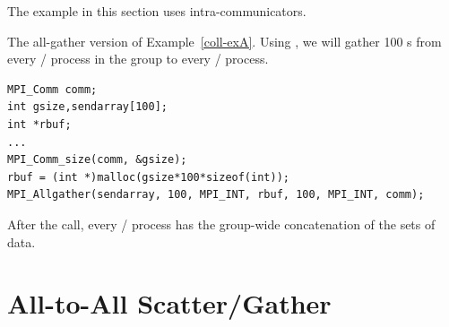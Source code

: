 The example in this section uses intra-communicators.

\begin{example}
\label{coll-exY}
%
The all-gather version of Example~\ref{coll-exA}.
Using , we will gather 100 s from every \MPI/ process in the
group to every \MPI/ process.

\begin{lstlisting}[language={[MPI]C}]
MPI_Comm comm;
int gsize,sendarray[100];
int *rbuf;
...
MPI_Comm_size(comm, &gsize);
rbuf = (int *)malloc(gsize*100*sizeof(int));
MPI_Allgather(sendarray, 100, MPI_INT, rbuf, 100, MPI_INT, comm);
\end{lstlisting}

After the call, every \MPI/ process has the group-wide concatenation of the
sets of data.
\end{example}

\section{All-to-All Scatter/Gather}
\label{sec:coll-alltoall}

